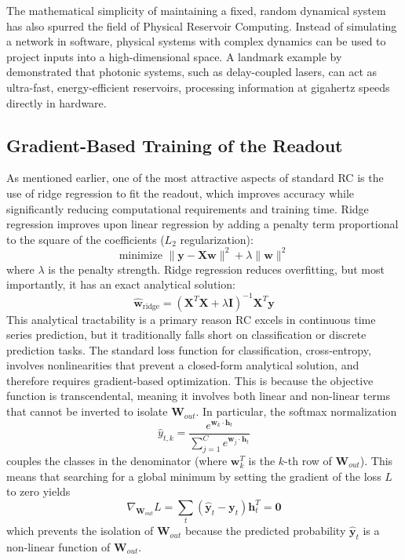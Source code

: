 \documentclass{sapthesis}
\begin{document}
The mathematical simplicity of maintaining a fixed, random dynamical system has also spurred the field of Physical Reservoir Computing. Instead of simulating a network in software, physical systems with complex dynamics can be used to project inputs into a high-dimensional space. A landmark example by~\cite{Brunner2013ParallelPI} demonstrated that photonic systems, such as delay-coupled lasers, can act as ultra-fast, energy-efficient reservoirs, processing information at gigahertz speeds directly in hardware.

\subsection{Gradient-Based Training of the Readout}
As mentioned earlier, one of the most attractive aspects of standard RC is the use of ridge regression to fit the readout, which improves accuracy while significantly reducing computational requirements and training time.
Ridge regression improves upon linear regression by adding a penalty term proportional to the square of the coefficients ($L_2$ regularization):
\[ \text{minimize } \|\mathbf{y} - \mathbf{X}\mathbf{w}\|^2 + \lambda \|\mathbf{w}\|^2 \]
where $\lambda$ is the penalty strength. Ridge regression reduces overfitting, but most importantly, it has an exact analytical solution:
\[ \hat{\mathbf{w}}_{\text{ridge}} = (\mathbf{X}^T\mathbf{X} + \lambda\mathbf{I})^{-1}\mathbf{X}^T\mathbf{y} \]
This analytical tractability is a primary reason RC excels in continuous time series prediction, but it traditionally falls short on classification or discrete prediction tasks. The standard loss function for classification, cross-entropy, involves nonlinearities that prevent a closed-form analytical solution, and therefore requires gradient-based optimization. This is because the objective function is transcendental, meaning it involves both linear and non-linear terms that cannot be inverted to isolate $\mathbf{W}_{out}$. In particular, the softmax normalization
\[
  \hat{y}_{t,k} = \frac{e^{\mathbf{w}_k \cdot \mathbf{h}_t}}{\sum_{j=1}^{C} e^{\mathbf{w}_j \cdot \mathbf{h}_t}}
\]
couples the classes in the denominator (where $\mathbf{w}_k^T$ is the $k$-th row of $\mathbf{W}_{out}$). This means that searching for a global minimum by setting the gradient of the loss $L$ to zero yields
\[
  \nabla_{\mathbf{W}_{out}} L = \sum_t (\hat{\mathbf{y}}_t - \mathbf{y}_t)\mathbf{h}_t^T = \mathbf{0}
\]
which prevents the isolation of $\mathbf{W}_{out}$ because the predicted probability $\hat{\mathbf{y}}_t$ is a non-linear function of $\mathbf{W}_{out}$.
\end{document}
